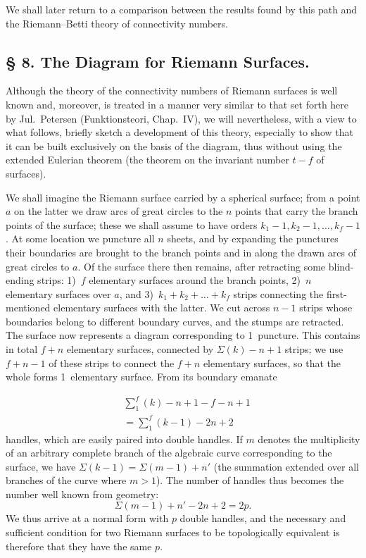 \documentclass{article}
\begin{document}
We shall later return to a comparison between the results found by this path and the Riemann--Betti theory of connectivity numbers.

\subsection*{§ 8. The Diagram for Riemann Surfaces.}

Although the theory of the connectivity numbers of Riemann surfaces is well known and, moreover, is treated in a manner very similar to that set forth here by Jul.~Petersen (Funktionsteori, Chap.\ IV), we will nevertheless, with a view to what follows, briefly sketch a development of this theory, especially to show that it can be built exclusively on the basis of the diagram, thus without using the extended Eulerian theorem (the theorem on the invariant number $t - f$ of surfaces).

We shall imagine the Riemann surface carried by a spherical surface; from a point $a$ on the latter we draw arcs of great circles to the $n$ points that carry the branch points of the surface; these we shall assume to have orders $k_1 - 1, k_2 - 1, \dots, k_f - 1$. At some location we puncture all $n$ sheets, and by expanding the punctures their boundaries are brought to the branch points and in along the drawn arcs of great circles to $a$. Of the surface there then remains, after retracting some blind-ending strips: 1)~$f$ elementary surfaces around the branch points, 2)~$n$ elementary surfaces over $a$, and 3)~$k_1 + k_2 + \dots + k_f$ strips connecting the first-mentioned elementary surfaces with the latter. We cut across $n - 1$ strips whose boundaries belong to different boundary curves, and the stumps are retracted. The surface now represents a diagram corresponding to 1~puncture. This contains in total $f + n$ elementary surfaces, connected by $\Sigma(k) - n + 1$ strips; we use $f + n - 1$ of these strips to connect the $f + n$ elementary surfaces, so that the whole forms 1~elementary surface. From its boundary emanate

\[
\begin{aligned}
&\sum_1^f (k) - n + 1 - f - n + 1 \\
&= \sum_1^f (k - 1) - 2n + 2
\end{aligned}
\]
handles, which are easily paired into double handles. If $m$ denotes the multiplicity of an arbitrary complete branch of the algebraic curve corresponding to the surface, we have $\Sigma(k - 1) = \Sigma(m - 1) + n'$ (the summation extended over all branches of the curve where $m > 1$). The number of handles thus becomes the number well known from geometry:
\[
\Sigma(m - 1) + n' - 2n + 2 = 2p.
\]
We thus arrive at a normal form with $p$ double handles, and the necessary and sufficient condition for two Riemann surfaces to be topologically equivalent is therefore that they have the same $p$.
\end{document}
